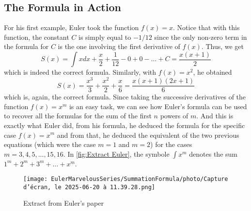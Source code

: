 \subsection*{The Formula in Action}

For his first example, Euler took the function $f(x) = x$. Notice that with this function, the constant $C$ is simply equal to $-1/12$ since the only non-zero term in the formula for $C$ is the one involving the first derivative of $f(x)$. Thus, we get
$$S(x) = \int xdx + \frac{x}{2} + \frac{1}{12} - 0 + 0 - \dots +C= \frac{x(x+1)}{2}$$
which is indeed the correct formula. Similarly, with $f(x) = x^2$, he obtained
$$S(x) = \frac{x^3}{3} + \frac{x^2 }{2} + \frac{x}{6} = \frac{x(x+1)(2x+1)}{6}$$
which is, again, the correct formula. Since taking the successive derivatives of the function $f(x) = x^m$ is an easy task, we can see how Euler's formula can be used to recover all the formulas for the sum of the first $n$ powers of $m$. And this is exactly what Euler did, from his formula, he deduced the formula for the specific case $f(x) = x^m$ and from that, he deduced the equivalent of the two previous equations (which were the case $m=1$ and $m=2$) for the cases $m=3, 4, 5, ..., 15, 16$. In \autoref{fig:Extract Euler}, the symbole $\int x^m$ denotes the sum $1^m + 2^m + 3^m + \dots + x^m$.

\begin{figure}[h]
    \centering
    \texttt{[image: EulerMarvelousSeries/SummationFormula/photo/Capture d’écran, le 2025-06-20 à 11.39.28.png]}
    \caption{Extract from Euler's paper}
    \label{fig:Extract Euler}
\end{figure}


